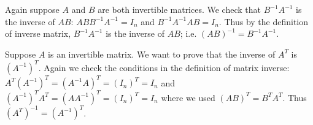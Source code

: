 \documentclass[12pt,letterpaper]{article}
\begin{document}
\begin{enumerate}
\begin{enumerate}
\Part Again suppose $A$ and $B$ are both invertible matrices. We check that $B^{-1}A^{-1}$ is the inverse of $AB$: $ABB^{-1}A^{-1}=I_n$ and $B^{-1}A^{-1}AB=I_n$. Thus by the definition of inverse matrix, $B^{-1}A^{-1}$ is the inverse of $AB$; i.e. $(AB)^{-1}=B^{-1}A^{-1}$.

\Part Suppose $A$ is an invertible matrix. We want to prove that the inverse of $A^{T}$ is $(A^{-1})^{T}$. Again we check the conditions in the definition of matrix inverse: $A^{T}(A^{-1})^{T}=(A^{-1}A)^{T}=(I_n)^{T}=I_n$ and $(A^{-1})^{T}A^{T}=(AA^{-1})^{T}=(I_n)^{T}=I_n$ where we used $(AB)^{T}=B^{T}A^{T}$. Thus $(A^{T})^{-1}=(A^{-1})^{T}$.

\end{enumerate}
\end{enumerate}
\end{document}
